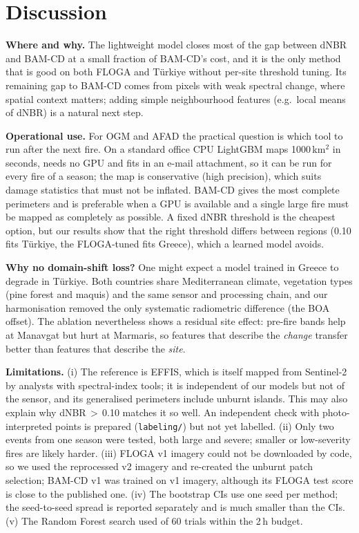 \section{Discussion}\label{sec:discussion}
\textbf{Where and why.} The lightweight model closes most of the gap between dNBR and BAM-CD at a small fraction
of BAM-CD's cost, and it is the only method that is good on both FLOGA and Türkiye without per-site threshold
tuning. Its remaining gap to BAM-CD comes from pixels with weak spectral change, where spatial context matters;
adding simple neighbourhood features (e.g.\ local means of dNBR) is a natural next step.

\textbf{Operational use.} For OGM and AFAD the practical question is which tool to run after the next fire. On a
standard office CPU LightGBM maps 1000\,km$^2$ in seconds, needs no GPU and fits in an e-mail attachment, so it
can be run for every fire of a season; the map is conservative (high precision), which suits damage statistics
that must not be inflated. BAM-CD gives the most complete perimeters and is preferable when a GPU is available
and a single large fire must be mapped as completely as possible. A fixed dNBR threshold is the cheapest option,
but our results show that the right threshold differs between regions (0.10 fits Türkiye, the FLOGA-tuned
\DnbrFlogaThr{} fits Greece), which a learned model avoids.

\textbf{Why no domain-shift loss?} One might expect a model trained in Greece to degrade in Türkiye. Both countries
share Mediterranean climate, vegetation types (pine forest and maquis) and the same sensor and processing
chain, and our harmonisation removed the only systematic radiometric difference (the BOA offset). The ablation
nevertheless shows a residual site effect: pre-fire bands help at Manavgat but hurt at Marmaris, so features that
describe the \emph{change} transfer better than features that describe the \emph{site}.

\textbf{Limitations.} (i) The reference is EFFIS, which is itself mapped from Sentinel-2 by analysts with
spectral-index tools; it is independent of our models but not of the sensor, and its generalised perimeters
include unburnt islands. This may also explain why dNBR\,$>$\,0.10 matches it so well. An independent check with
photo-interpreted points is prepared (\texttt{labeling/}) but not yet labelled. (ii) Only two events from one
season were tested, both large and severe; smaller or low-severity fires are likely harder. (iii) FLOGA v1
imagery could not be downloaded by code, so we used the reprocessed v2 imagery and re-created the unburnt patch
selection; BAM-CD v1 was trained on v1 imagery, although its FLOGA test score is close to the published one.
(iv) The bootstrap CIs use one seed per method; the seed-to-seed spread is reported separately and is much
smaller than the CIs. (v) The Random Forest search used \HpoTrialsRf{} of 60 trials within the 2\,h budget.

